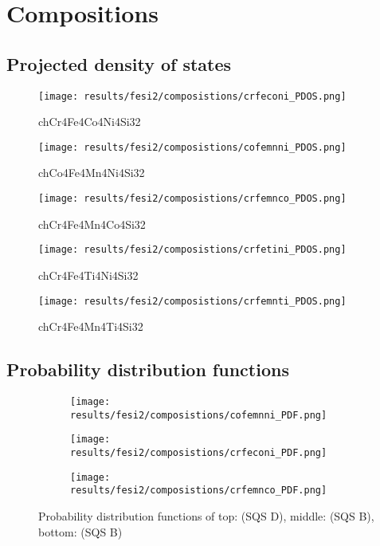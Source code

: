 \chapter{Compositions}
\label{appendix:dos}

\section{Projected density of states}

\begin{figure}[H]
	\texttt{[image: results/fesi2/composistions/crfeconi\_PDOS.png]}
	\caption{ch{Cr4Fe4Co4Ni4Si32}}
\end{figure}

\begin{figure}[H]
	\texttt{[image: results/fesi2/composistions/cofemnni\_PDOS.png]}
	\caption{ch{Co4Fe4Mn4Ni4Si32}}
\end{figure}

\begin{figure}[H]
	\texttt{[image: results/fesi2/composistions/crfemnco\_PDOS.png]}
	\caption{ch{Cr4Fe4Mn4Co4Si32}}

\end{figure}

\begin{figure}[H]
	\texttt{[image: results/fesi2/composistions/crfetini\_PDOS.png]}
	\caption{ch{Cr4Fe4Ti4Ni4Si32}}

\end{figure}

\begin{figure}[H]
	\texttt{[image: results/fesi2/composistions/crfemnti\_PDOS.png]}
	\caption{ch{Cr4Fe4Mn4Ti4Si32}}
\end{figure}

\section{Probability distribution functions}

\begin{figure}[H]
	\centering
	\begin{subfigure}{\textwidth}
		\texttt{[image: results/fesi2/composistions/cofemnni\_PDF.png]}
	\end{subfigure}
	\begin{subfigure}{\textwidth}
		\texttt{[image: results/fesi2/composistions/crfeconi\_PDF.png]}
	\end{subfigure}
	\begin{subfigure}{\textwidth}
		\texttt{[image: results/fesi2/composistions/crfemnco\_PDF.png]}
	\end{subfigure}
	\caption{Probability distribution functions of top:  (SQS D), middle:  (SQS B), bottom:  (SQS B)}
\end{figure}

